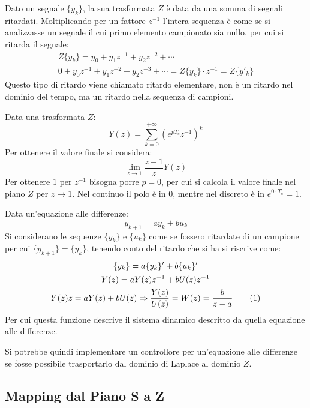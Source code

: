 \documentclass{article}
\numberwithin{equation}{subsection}
\newcommand{\tageq}{\tag{\stepcounter{equation}\theequation}}
\begin{document}
Dato un segnale $\{y_k\}$, la sua trasformata $Z$ è data da una somma di segnali ritardati. Moltiplicando per un fattore $z^{-1}$ l'intera sequenza è come se si analizzasse 
un segnale il cui primo elemento campionato sia nullo, per cui si ritarda il segnale:
\begin{gather*}
    Z\{y_k\}=y_0+y_1z^{-1}+y_2z^{-2}+\cdots\\
    0+y_0z^{-1}+y_1z^{-2}+y_2z^{-3}+\cdots=Z\{y_k\}\cdot z^{-1}=Z\{y'_k\}
\end{gather*}
Questo tipo di ritardo viene chiamato ritardo elementare, non è un ritardo nel dominio del tempo, ma un ritardo nella sequenza di campioni. 


Data una trasformata $Z$:
\begin{equation*}
    Y(z)=\displaystyle\sum_{k=0}^{+\infty}(e^{pT_c}z^{-1})^k
\end{equation*}    
Per ottenere il valore finale si considera:
\begin{equation*}
    \lim_{z\to1}\displaystyle\frac{z-1}{z}Y(z)
\end{equation*}
Per ottenere $1$ per $z^{-1}$ bisogna porre $p=0$, per cui si calcola il valore finale nel piano $Z$ per $z\to1$. Nel continuo il polo è in $0$, mentre nel discreto è in 
$e^{0\cdot T_c}=1$.  


Data un'equazione alle differenze: 
\begin{equation*}
    y_{k+1}=ay_k+bu_k
\end{equation*}
Si considerano le sequenze $\{y_k\}$ e $\{u_k\}$ come se fossero ritardate di un campione per cui $\{y_{k+1}\}=\{y_k\}$, tenendo conto del ritardo che si ha si riscrive come:
\begin{gather*}
    \{y_k\}=a\{y_k\}'+b\{u_k\}'\\
    Y(z)=aY(z)z^{-1}+bU(z)z^{-1}\\
    Y(z)z=aY(z)+bU(z)\Rightarrow \displaystyle\frac{Y(z)}{U(z)}=W(z)=\displaystyle\frac{b}{z-a}\tageq
\end{gather*}
Per cui questa funzione descrive il sistema dinamico descritto da quella equazione alle differenze. 

Si potrebbe quindi implementare un controllore per un'equazione alle differenze se fosse possibile trasportarlo dal dominio di Laplace al dominio $Z$. 

\subsection{Mapping dal Piano S a Z}
\end{document}

